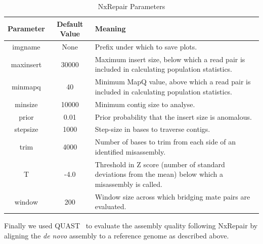 \documentclass[fleqn,10pt]{wlpeerj}
\begin{document}
\begin{table}
\begin{center}
\begin{tabular}{|c|c|p{8cm}|}
    \hline
    Parameter & Default Value & Meaning \\ \hline
    imgname & None & Prefix under which to save plots. \\
    maxinsert & 30000 &  Maximum insert size, below which a read pair is included in calculating population statistics.\\
    minmapq & 40 & Minimum MapQ value, above which a read pair is included in calculating population statistics.\\
    minsize & 10000 & Minimum contig size to analyse.\\ 
    prior & 0.01 & Prior probability that the insert size is anomalous.\\
    stepsize & 1000 & Step-size in bases to traverse contigs.\\
    trim & 4000 & Number of bases to trim from each side of an identified misassembly.\\
    T & -4.0 & Threshold in Z score (number of standard deviations from the mean) below which a misassembly is called.\\
    window & 200 & Window size across which bridging mate pairs are evaluated.\\ \hline
\end{tabular}
\end{center}
\caption{NxRepair Parameters \label{tab:parameters}}
\end{table}

Finally we used QUAST~\citep{gurevich2013} to evaluate the assembly quality following NxRepair by aligning the \textit{de novo} assembly to a reference genome as described above.
\end{document}
